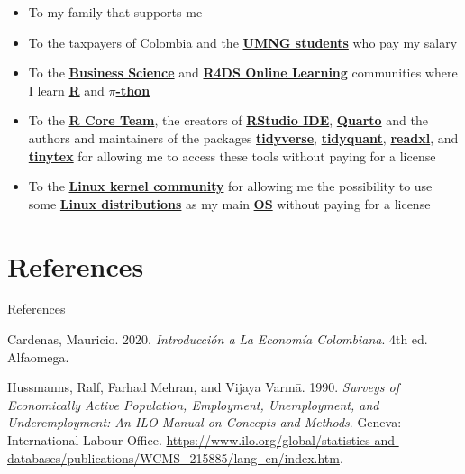 \documentclass[
  ignorenonframetext,
]{beamer}
\newlength{\cslhangindent}
\newenvironment{CSLReferences}[2] %
 {\begin{list}{}{%
  \setlength{\itemindent}{0pt}
  \setlength{\leftmargin}{0pt}
  \setlength{\parsep}{0pt}
  \ifodd #1
   \setlength{\leftmargin}{\cslhangindent}
   \setlength{\itemindent}{-1\cslhangindent}
  \fi
  \setlength{\itemsep}{#2\baselineskip}}}
 {\end{list}}
\begin{document}
\begin{frame}{}
\label{section-17}
\begin{itemize}
\item
  To my family that supports me
\item
  To the taxpayers of Colombia and the
  \href{https://www.umng.edu.co/estudiante}{\textbf{UMNG students}} who
  pay my salary
\item
  To the \href{https://www.business-science.io/}{\textbf{Business
  Science}} and \href{https://www.rfordatasci.com/}{\textbf{R4DS Online
  Learning}} communities where I learn
  \href{https://www.r-project.org/about.html}{\textbf{R}} and
  \href{https://www.python.org/about/}{\textbf{\(\pi\)-thon}}
\item
  To the \href{https://www.r-project.org/contributors.html}{\textbf{R
  Core Team}}, the creators of
  \href{https://rstudio.com/products/rstudio/}{\textbf{RStudio IDE}},
  \href{https://quarto.org/}{\textbf{Quarto}} and the authors and
  maintainers of the packages
  \href{https://CRAN.R-project.org/package=tidyverse}{\textbf{tidyverse}},
  \href{https://CRAN.R-project.org/package=tidyquant}{\textbf{tidyquant}},
  \href{https://CRAN.R-project.org/package=readxl}{\textbf{readxl}}, and
  \href{https://CRAN.R-project.org/package=tinytex}{\textbf{tinytex}}
  for allowing me to access these tools without paying for a license
\item
  To the \href{https://www.kernel.org/category/about.html}{\textbf{Linux
  kernel community}} for allowing me the possibility to use some
  \href{https://static.lwn.net/Distributions/}{\textbf{Linux
  distributions}} as my main
  \href{https://en.wikipedia.org/wiki/Operating_system}{\textbf{OS}}
  without paying for a license
\end{itemize}
\end{frame}

\section*{References}\label{references}

\begin{frame}[allowframebreaks]{References}
\label{refs}
\begin{CSLReferences}{1}{0}
Cardenas, Mauricio. 2020. \emph{Introducción a La {Economía}
{Colombiana}}. 4th ed. Alfaomega.

Hussmanns, Ralf, Farhad Mehran, and Vijaya Varmā. 1990. \emph{Surveys of
Economically Active Population, Employment, Unemployment, and
Underemployment: An {ILO} Manual on Concepts and Methods}. Geneva:
International Labour Office.
\url{https://www.ilo.org/global/statistics-and-databases/publications/WCMS_215885/lang--en/index.htm}.

\end{CSLReferences}
\end{frame}
\end{document}
